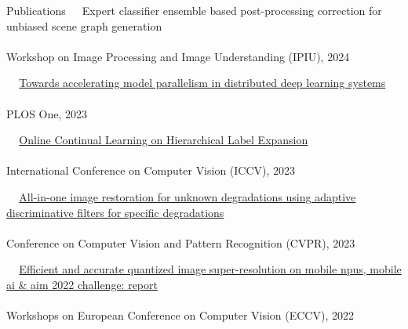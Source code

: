 \documentclass{resume} %
\newcommand{\mycolor}[1]{\textcolor{myurlcolor}{#1}}
\begin{document}
\begin{rSection}{Publications}
\textbullet~\,\, {\mycolor{Expert classifier ensemble based post-processing correction for unbiased scene graph generation}}
\\ 
\\ \hspace*{1.5em}Workshop on Image Processing and Image Understanding (IPIU), 2024



\textbullet~\,\, \href{https://journals.plos.org/plosone/article?id=10.1371/journal.pone.0293338}{Towards accelerating model parallelism in distributed deep learning systems}
\\ 
\\ \hspace*{1.5em}PLOS One, 2023


\textbullet~\,\, \href{https://ieeexplore.ieee.org/document/10377260}{Online Continual Learning on Hierarchical Label Expansion
}
\\ 
\\ \hspace*{1.5em}International Conference on Computer Vision (ICCV), 2023


\textbullet~\,\, \href{https://ieeexplore.ieee.org/document/10204770}{All-in-one image restoration for unknown degradations using adaptive discriminative filters for specific degradations}
\\ 
\\ \hspace*{1.5em}Conference on Computer Vision and Pattern Recognition (CVPR), 2023


\textbullet~\,\, \href{https://link.springer.com/chapter/10.1007/978-3-031-25066-8_4}{Efficient and accurate quantized image super-resolution on mobile npus, mobile ai \& aim 2022 challenge: report
}
\\ 
\\ \hspace*{1.5em}Workshops on European Conference on Computer Vision (ECCV), 2022



\end{rSection}
\end{document}
